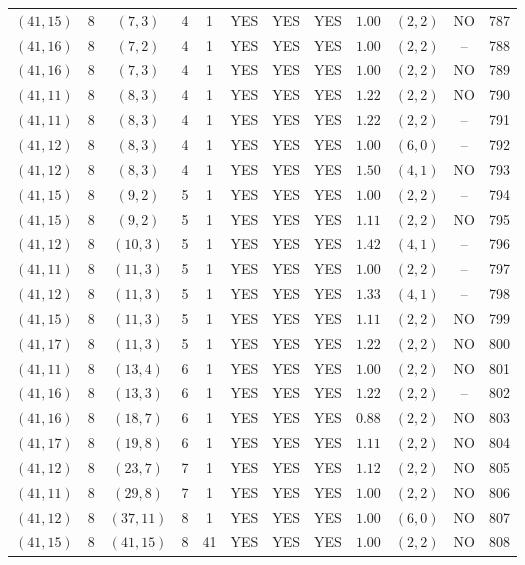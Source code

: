 \begin{longtable}{|c|c|c|c|c|c|c|c|c|c|c|c|}
$(41,15)$ & 8 & $(7,3)$ & 4 & 1 & YES & YES & YES & $1.00$ & $(2,2)$ & NO & 787\\
$(41,16)$ & 8 & $(7,2)$ & 4 & 1 & YES & YES & YES & $1.00$ & $(2,2)$ & -- & 788\\
$(41,16)$ & 8 & $(7,3)$ & 4 & 1 & YES & YES & YES & $1.00$ & $(2,2)$ & NO & 789\\
$(41,11)$ & 8 & $(8,3)$ & 4 & 1 & YES & YES & YES & $1.22$ & $(2,2)$ & NO & 790\\
$(41,11)$ & 8 & $(8,3)$ & 4 & 1 & YES & YES & YES & $1.22$ & $(2,2)$ & -- & 791\\
$(41,12)$ & 8 & $(8,3)$ & 4 & 1 & YES & YES & YES & $1.00$ & $(6,0)$ & -- & 792\\
$(41,12)$ & 8 & $(8,3)$ & 4 & 1 & YES & YES & YES & $1.50$ & $(4,1)$ & NO & 793\\
$(41,15)$ & 8 & $(9,2)$ & 5 & 1 & YES & YES & YES & $1.00$ & $(2,2)$ & -- & 794\\
$(41,15)$ & 8 & $(9,2)$ & 5 & 1 & YES & YES & YES & $1.11$ & $(2,2)$ & NO & 795\\
$(41,12)$ & 8 & $(10,3)$ & 5 & 1 & YES & YES & YES & $1.42$ & $(4,1)$ & -- & 796\\
$(41,11)$ & 8 & $(11,3)$ & 5 & 1 & YES & YES & YES & $1.00$ & $(2,2)$ & -- & 797\\
$(41,12)$ & 8 & $(11,3)$ & 5 & 1 & YES & YES & YES & $1.33$ & $(4,1)$ & -- & 798\\
$(41,15)$ & 8 & $(11,3)$ & 5 & 1 & YES & YES & YES & $1.11$ & $(2,2)$ & NO & 799\\
$(41,17)$ & 8 & $(11,3)$ & 5 & 1 & YES & YES & YES & $1.22$ & $(2,2)$ & NO & 800\\
$(41,11)$ & 8 & $(13,4)$ & 6 & 1 & YES & YES & YES & $1.00$ & $(2,2)$ & NO & 801\\
$(41,16)$ & 8 & $(13,3)$ & 6 & 1 & YES & YES & YES & $1.22$ & $(2,2)$ & -- & 802\\
$(41,16)$ & 8 & $(18,7)$ & 6 & 1 & YES & YES & YES & $0.88$ & $(2,2)$ & NO & 803\\
$(41,17)$ & 8 & $(19,8)$ & 6 & 1 & YES & YES & YES & $1.11$ & $(2,2)$ & NO & 804\\
$(41,12)$ & 8 & $(23,7)$ & 7 & 1 & YES & YES & YES & $1.12$ & $(2,2)$ & NO & 805\\
$(41,11)$ & 8 & $(29,8)$ & 7 & 1 & YES & YES & YES & $1.00$ & $(2,2)$ & NO & 806\\
$(41,12)$ & 8 & $(37,11)$ & 8 & 1 & YES & YES & YES & $1.00$ & $(6,0)$ & NO & 807\\
$(41,15)$ & 8 & $(41,15)$ & 8 & 41 & YES & YES & YES & $1.00$ & $(2,2)$ & NO & 808\\

\end{longtable}
